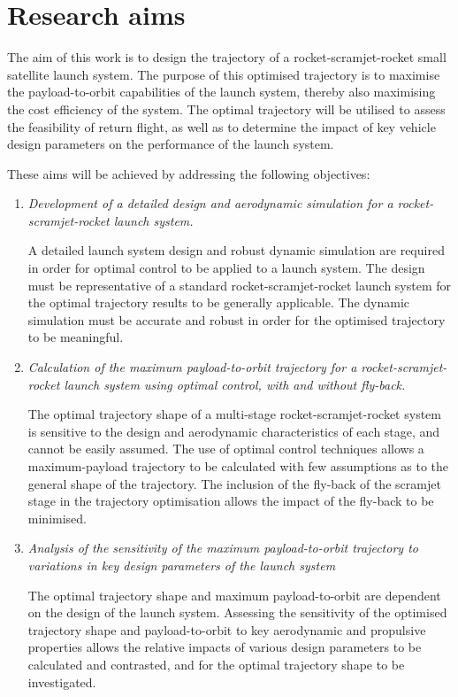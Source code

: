   	  	

  \section{Research aims}

    The aim of this work is to design the trajectory of a rocket-scramjet-rocket small satellite launch system. The purpose of this optimised trajectory is to maximise the payload-to-orbit capabilities of the launch system, thereby also maximising the cost efficiency of the system. The optimal trajectory will be utilised to assess the feasibility of return flight, as well as to determine the impact of key vehicle design parameters on the performance of the launch system. 
 
    
\vspace*{10pt}
    \noindent These aims will be achieved by addressing the following objectives:
    \begin{enumerate}
    	 \item \emph{Development of a detailed design and aerodynamic simulation for a rocket-scramjet-rocket launch system.}
    	 
    	   A detailed launch system design and robust dynamic simulation are required in order for optimal control to be applied to a launch system. The design must be representative of a standard rocket-scramjet-rocket launch system for the optimal trajectory results to be generally applicable. The dynamic simulation must be accurate and robust in order for the optimised trajectory to be meaningful. \\

\item \emph{Calculation of the maximum payload-to-orbit trajectory for a rocket-scramjet-rocket launch system using optimal control, with and without fly-back.}

The optimal trajectory shape of a multi-stage rocket-scramjet-rocket system is sensitive to the design and aerodynamic characteristics of each stage, and cannot be easily assumed. The use of optimal control techniques allows a maximum-payload trajectory to be calculated with few assumptions as to the general shape of the trajectory. The inclusion of the fly-back of the scramjet stage in the trajectory optimisation allows the impact of the fly-back to be minimised.\\

      \item \emph{Analysis of the sensitivity of the maximum payload-to-orbit trajectory to variations in key design parameters of the launch system} 

	The optimal trajectory shape and maximum payload-to-orbit are dependent on the design of the launch system. 
	Assessing the sensitivity of the optimised trajectory shape and payload-to-orbit to key aerodynamic and propulsive properties allows the relative impacts of various design parameters to be calculated and contrasted, and for the optimal trajectory shape to be investigated. \\

    

    \end{enumerate}

